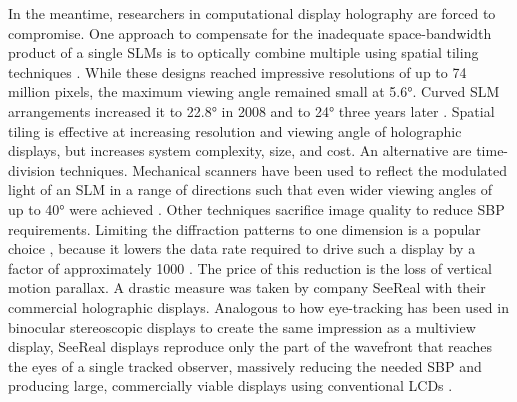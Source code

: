 In the meantime, researchers in computational display holography are forced to compromise. One approach to compensate for the inadequate space-bandwidth product of a single SLMs is to optically combine multiple using spatial tiling techniques \cite{Maeno_Fukaya_Nishikawa_Sato_Honda_1996, sasaki2014large}. While these designs reached impressive resolutions of up to 74 million pixels, the maximum viewing angle remained small at \ang{5.6}. Curved SLM arrangements increased it to \ang{22.8} \cite{Hahn_Kim_Lim_Park_Lee_2008} in 2008 and to \ang{24} three years later \cite{Yaraş_Kang_Onural_2011}. Spatial tiling is effective at increasing resolution and viewing angle of holographic displays, but increases system complexity, size, and cost. An alternative are time-division techniques. Mechanical scanners have been used to reflect the modulated light of an SLM in a range of directions such that even wider viewing angles of up to \ang{40} were achieved \cite{Takaki_Fujii_2014}. Other techniques sacrifice image quality to reduce SBP requirements. Limiting the diffraction patterns to one dimension is a popular choice \cite{An_Won_Kim_Hong_Kim_Kim_Song_Choi_Kim_Seo_2020, takaki2012accommodation, kozacki2021fourier, henrie2017hardware}, because it lowers the data rate required to drive such a display by a factor of approximately 1000 \cite{Blanche_2021}. The price of this reduction is the loss of vertical motion parallax. A drastic measure was taken by company SeeReal with their commercial holographic displays. Analogous to how eye-tracking has been used in binocular stereoscopic displays to create the same impression as a multiview display, SeeReal displays reproduce only the part of the wavefront that reaches the eyes of a single tracked observer, massively reducing the needed SBP and producing large, commercially viable displays using conventional LCDs \cite{Häussler_Leister_Stolle_2017}.
